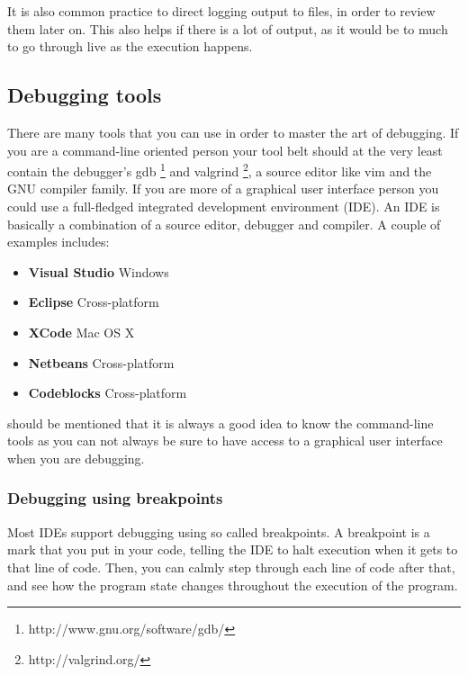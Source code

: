 \documentclass[11pt,a4paper,twoside]{article}
\begin{document}
It is also common practice to direct logging output to files, in order to
review them later on. This also helps if there is a lot of output, as it would
be to much to go through live as the execution happens.

\subsection{Debugging tools}

There are many tools that you can use in order to master the art of debugging.
If you are a command-line oriented person your tool belt should at the very
least contain the debugger's gdb \footnote{http://www.gnu.org/software/gdb/}
and valgrind \footnote{http://valgrind.org/}, a source editor like vim and the
GNU compiler family. If you are more of a graphical user interface person you
could use a full-fledged integrated development environment (IDE). An IDE is
basically a combination of a source editor, debugger and compiler. A couple of
examples includes:

\begin{itemize}
\item \textbf{Visual Studio} Windows
\item \textbf{Eclipse} Cross-platform
\item \textbf{XCode} Mac OS X
\item \textbf{Netbeans} Cross-platform
\item \textbf{Codeblocks} Cross-platform
\end{itemize}


 should be mentioned that it is always a good idea to know the
command-line tools as you can not always be sure to have access to a graphical
user interface when you are debugging.  

\subsubsection{Debugging using breakpoints}

Most IDEs support debugging using so called breakpoints. A breakpoint is a mark
that you put in your code, telling the IDE to halt execution when it gets to
that line of code. Then, you can calmly step through each line of code after
that, and see how the program state changes throughout the execution of the
program.

\end{document}

